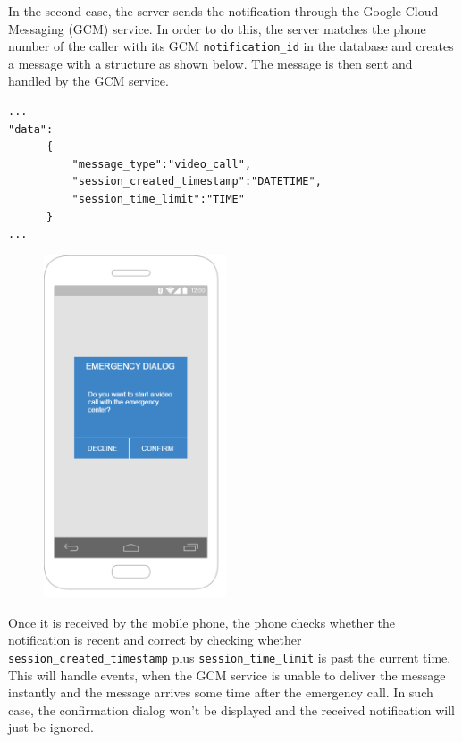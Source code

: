 \documentclass{article}
\begin{document}
In the second case, the server sends the notification through the Google Cloud Messaging (GCM) service. In order to do this, the server matches the phone number of the caller with its GCM \texttt{\color{OliveGreen}notification\_id} in the database and creates a message with a structure as shown below. The message is then sent and handled by the GCM service.
\begin{lstlisting}
...
"data":
      {
          "message_type":"video_call",
          "session_created_timestamp":"DATETIME",
          "session_time_limit":"TIME"
      }
...

\end{lstlisting}

\begin{figure}
\vspace{-20pt}
  \begin{center}
    \includegraphics[width=0.48\textwidth]{"EmergencyAppIteration1/emergencydialog"}
  \end{center}
\vspace{-110pt}
\end{figure}
Once it is received by the mobile phone, the phone checks whether the notification is recent and correct by checking whether \texttt{\color{OliveGreen}session\_created\_timestamp} plus \texttt{\color{OliveGreen}session\_time\_limit} is past the current time. This will handle events, when the GCM service is unable to deliver the message instantly and the message arrives some time after the emergency call. In such case, the confirmation dialog won’t be displayed and the received notification will just be ignored.\\
\end{document}
